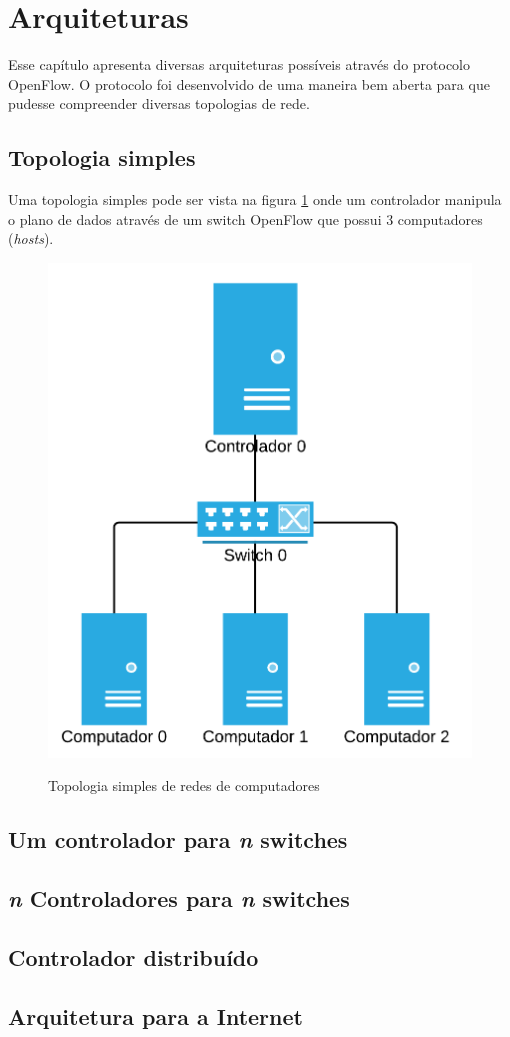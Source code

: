 \section{Arquiteturas}

Esse capítulo apresenta diversas arquiteturas possíveis através do 
protocolo OpenFlow. 
O protocolo foi desenvolvido de uma maneira bem aberta para que pudesse 
compreender diversas topologias de rede. 

\subsection{Topologia simples}

Uma topologia simples pode ser vista na figura \ref{fig:simple-topology} onde
um controlador manipula o plano de dados através de um switch OpenFlow 
que possui 3 computadores (\emph{hosts}).

\begin{figure}[h!]
    \centering
    \includegraphics{img/simple-topology}
    \label{fig:simple-topology}
    \caption{Topologia simples de redes de computadores}
\end{figure}


\subsection{Um controlador para \emph{n} switches}

\subsection{\emph{n} Controladores para \emph{n} switches}

\subsection{Controlador distribuído}

\subsection{Arquitetura para a Internet}
